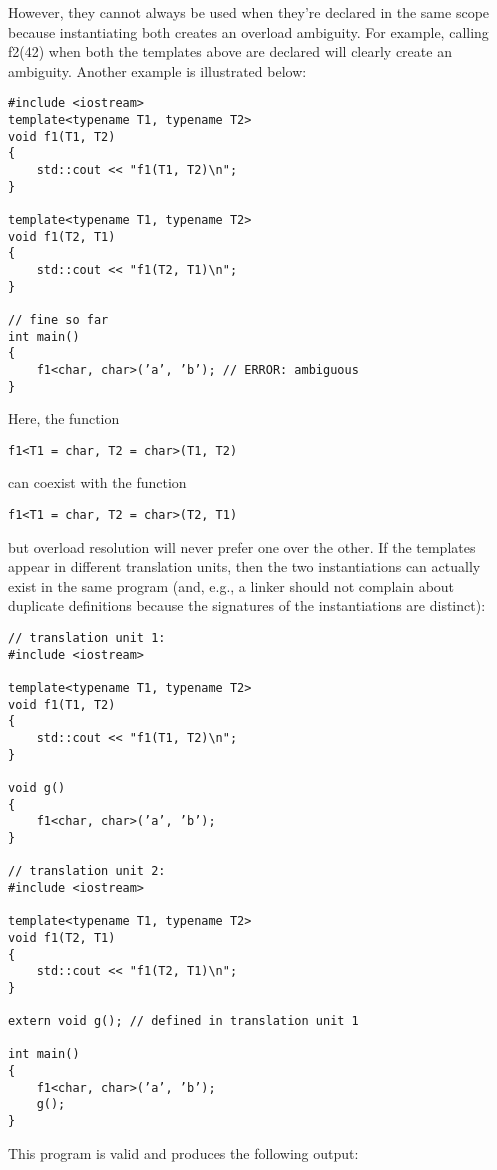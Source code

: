 However, they cannot always be used when they’re declared in the same scope because instantiating both creates an overload ambiguity. For example, calling f2(42) when both the templates above are declared will clearly create an ambiguity. Another example is illustrated below:

\begin{lstlisting}[style=styleCXX]
#include <iostream>
template<typename T1, typename T2>
void f1(T1, T2)
{
	std::cout << "f1(T1, T2)\n";
}

template<typename T1, typename T2>
void f1(T2, T1)
{
	std::cout << "f1(T2, T1)\n";
}

// fine so far
int main()
{
	f1<char, char>(’a’, ’b’); // ERROR: ambiguous
}
\end{lstlisting}

Here, the function

\begin{lstlisting}[style=styleCXX]
f1<T1 = char, T2 = char>(T1, T2)
\end{lstlisting}

can coexist with the function

\begin{lstlisting}[style=styleCXX]
f1<T1 = char, T2 = char>(T2, T1)
\end{lstlisting}

but overload resolution will never prefer one over the other. If the templates appear in different translation units, then the two instantiations can actually exist in the same program (and, e.g., a linker should not complain about duplicate definitions because the signatures of the instantiations are distinct):

\begin{lstlisting}[style=styleCXX]
// translation unit 1:
#include <iostream>

template<typename T1, typename T2>
void f1(T1, T2)
{
	std::cout << "f1(T1, T2)\n";
}

void g()
{
	f1<char, char>(’a’, ’b’);
}

// translation unit 2:
#include <iostream>

template<typename T1, typename T2>
void f1(T2, T1)
{
	std::cout << "f1(T2, T1)\n";
}

extern void g(); // defined in translation unit 1

int main()
{
	f1<char, char>(’a’, ’b’);
	g();
}
\end{lstlisting}

This program is valid and produces the following output:

